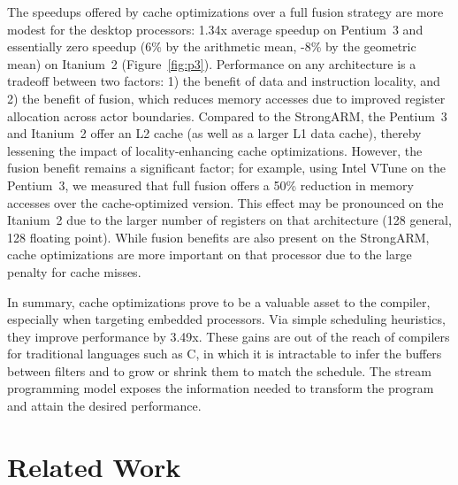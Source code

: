 The speedups offered by cache optimizations over a full fusion
strategy are more modest for the desktop processors: 1.34x average
speedup on Pentium~3 and essentially zero speedup (6\% by the
arithmetic mean, -8\% by the geometric mean) on Itanium~2
(Figure~\ref{fig:p3}).  
Performance on any architecture is a tradeoff between two factors: 1)
the benefit of data and instruction locality, and 2) the benefit of
fusion, which reduces memory accesses due to improved register
allocation across actor boundaries.  Compared to the StrongARM, the
Pentium~3 and Itanium~2 offer an L2 cache (as well as a larger L1 data
cache), thereby lessening the impact of locality-enhancing cache
optimizations.  However, the fusion benefit remains a significant
factor; for example, using Intel VTune on the Pentium~3, we measured
that full fusion offers a 50\% reduction in memory accesses over the
cache-optimized version.  This effect may be pronounced on the
Itanium~2 due to the larger number of registers on that architecture
(128 general, 128 floating point).  While fusion benefits are also
present on the StrongARM, cache optimizations are more important on
that processor due to the large penalty for cache misses.

In summary, cache optimizations prove to be a valuable asset to the
compiler, especially when targeting embedded processors.  Via simple
scheduling heuristics, they improve performance by 3.49x.  These gains
are out of the reach of compilers for traditional languages such as C,
in which it is intractable to infer the buffers between filters and to
grow or shrink them to match the schedule.  The stream programming
model exposes the information needed to transform the program and
attain the desired performance.

\section{Related Work}


